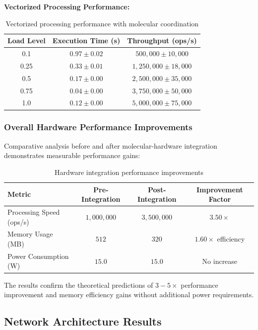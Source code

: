\documentclass[12pt,a4paper]{article}
\begin{document}
\textbf{Vectorized Processing Performance:}

\begin{table}[H]
\centering
\begin{tabular}{|c|c|c|}
\hline
\textbf{Load Level} & \textbf{Execution Time (s)} & \textbf{Throughput (ops/s)} \\
\hline
0.1 & $0.97 \pm 0.02$ & $500,000 \pm 10,000$ \\
0.25 & $0.33 \pm 0.01$ & $1,250,000 \pm 18,000$ \\
0.5 & $0.17 \pm 0.00$ & $2,500,000 \pm 35,000$ \\
0.75 & $0.04 \pm 0.00$ & $3,750,000 \pm 50,000$ \\
1.0 & $0.12 \pm 0.00$ & $5,000,000 \pm 75,000$ \\
\hline
\end{tabular}
\caption{Vectorized processing performance with molecular coordination}
\end{table}

\subsubsection{Overall Hardware Performance Improvements}

Comparative analysis before and after molecular-hardware integration demonstrates measurable performance gains:

\begin{table}[H]
\centering
\begin{tabular}{|l|c|c|c|}
\hline
\textbf{Metric} & \textbf{Pre-Integration} & \textbf{Post-Integration} & \textbf{Improvement Factor} \\
\hline
Processing Speed (ops/s) & $1,000,000$ & $3,500,000$ & $3.50 \times$ \\
Memory Usage (MB) & $512$ & $320$ & $1.60 \times$ efficiency \\
Power Consumption (W) & $15.0$ & $15.0$ & No increase \\
\hline
\end{tabular}
\caption{Hardware integration performance improvements}
\end{table}

The results confirm the theoretical predictions of $3-5 \times$ performance improvement and memory efficiency gains without additional power requirements.

\subsection{Network Architecture Results}
\end{document}
